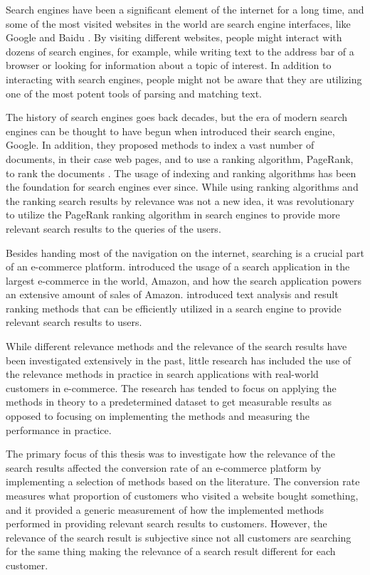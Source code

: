 
Search engines have been a significant element of the internet for a long time, 
and some of the most visited websites in the world are search engine interfaces, 
like Google and Baidu \cite{alexa}.
By visiting different websites, people might interact with dozens of search engines, 
for example, while writing text to the address bar of a browser or looking for information about a topic of interest.
In addition to interacting with search engines, people might not be aware that they are utilizing one of the most 
potent tools of parsing and matching text.


The history of search engines goes back decades, but the era of modern search engines can be thought to have begun
when \citeauthor{googleInit} \cite{googleInit} introduced their search engine, Google. 
In addition, they proposed methods to index a vast number of documents, in their case web pages, 
and to use a ranking algorithm, PageRank, to rank the documents \cite{googleInit}. 
The usage of indexing and ranking algorithms has been the foundation for search engines ever since.
While using ranking algorithms and the ranking search results by relevance was not a new idea, 
it was revolutionary to utilize the PageRank ranking algorithm in search engines to provide 
more relevant search results to the queries of the users.


Besides handing most of the navigation on the internet, 
searching is a crucial part of an e-commerce platform. 
\citeauthor{amazonJoyRanking} \cite{amazonJoyRanking} introduced the usage of a search application 
in the largest e-commerce in the world, Amazon, 
and how the search application powers an extensive amount of sales of Amazon.
\citeauthor{relevantSearch} \cite{relevantSearch} introduced text analysis and result ranking methods
that can be efficiently utilized in a search engine to provide relevant search results to users.


While different relevance methods and the relevance of the search results have been investigated extensively in the past, 
little research has included the use of the relevance methods in practice in search applications 
with real-world customers in e-commerce. 
The research has tended to focus on applying the methods in theory to a predetermined dataset to get measurable results
as opposed to focusing on implementing the methods and measuring the performance in practice. 


The primary focus of this thesis was to investigate how the relevance of the search results affected 
the conversion rate of an e-commerce platform by implementing a selection of methods based on the literature. 
The conversion rate measures what proportion of customers who visited a website bought something, 
and it provided a generic measurement of how the implemented methods performed in 
providing relevant search results to customers.
However, the relevance of the search result is subjective 
since not all customers are searching for the same thing making the relevance of a search result 
different for each customer.


